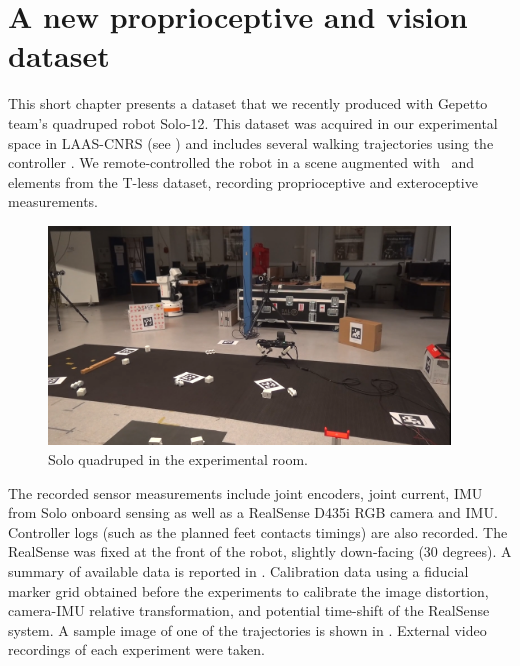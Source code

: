 \chapter{A new proprioceptive and vision dataset}
\label{chp:dataset}

This short chapter presents a dataset that we recently produced with Gepetto team's quadruped robot Solo-12. This dataset was acquired in our experimental space 
in LAAS-CNRS (see ) and includes several walking trajectories using the controller \cite{leziart2021implementation}. We remote-controlled the robot in a scene augmented 
with \apriltags\ and elements from the T-less dataset, recording proprioceptive and exteroceptive measurements. 

\begin{figure}[h]
    \centering
    \includegraphics[width=0.95\textwidth]{figures/solo_dataset_scene.png}
    \caption{Solo quadruped in the experimental room.}
    \label{fig:solo_dataset_scene}
\end{figure}

The recorded sensor measurements include joint encoders, joint current, IMU from Solo onboard sensing as well as a RealSense D435i RGB camera and IMU.
Controller logs (such as the planned feet contacts timings) are also recorded. The RealSense was fixed at the front of the robot, slightly down-facing (30 degrees).
A summary of available data is reported in . Calibration data using a fiducial marker grid obtained before the experiments to 
calibrate the image distortion, camera-IMU relative transformation, and potential time-shift of the RealSense system. A sample image of one of the trajectories
is shown in .
External video recordings of each experiment were taken.

